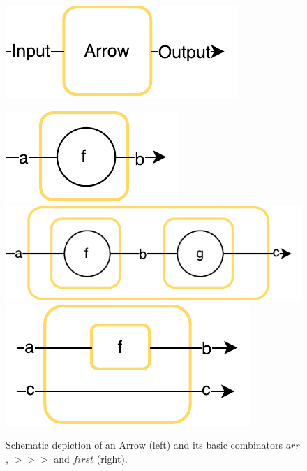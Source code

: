 \documentclass{jfp1}
\newcommand{\Varid}[1]{\mathit{#1}}
\begin{document}
\begin{figure}[t]
\centering
\parbox[c][17em]{0.49\linewidth}{%
\vfill
\centering
	\includegraphics{images/arrow}
\vfill
}
\parbox[c][17em]{0.49\linewidth}{%
\vfill
\centering
	{\includegraphics[scale=0.6]{images/arr}}
	{\includegraphics[scale=0.6]{images/compose}}
	{\includegraphics[scale=0.6]{images/first}}
\vfill
}
\caption{Schematic depiction of  an Arrow (left) and its basic
  combinators \ensuremath{\Varid{arr}}, \ensuremath{\mathbin{>\!\!>\!\!>}} and \ensuremath{\Varid{first}} (right).}
\label{fig:arrow-sch}
\label{fig:arrows-viz}
\end{figure}
\end{document}
